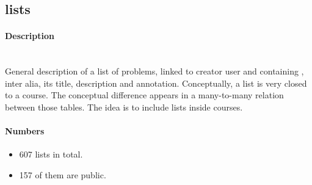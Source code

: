 
\subsection{lists} %
\label{sub:lists}

\begin{figure}
  \vspace{-20pt}
  \begin{center}
  \end{center}
  \vspace{-20pt}
\end{figure}

\paragraph{Description}~\\ %
General description of a list of problems, linked to creator user and containing , inter alia, its title, description and annotation.
Conceptually, a list is very closed to a course. The conceptual difference appears in a many-to-many relation between those tables. The idea is to include lists inside courses.

\paragraph{Numbers} %
\begin{itemize}
	\setlength\itemsep{0em}
	\item 607 lists in total.
	\item 157 of them are public.
\end{itemize}



